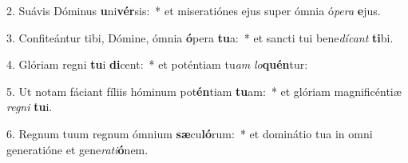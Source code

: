 2. Suávis Dóminus \textbf{u}ni\textbf{vér}sis:~*  et miseratiónes ejus super ómnia ó\textit{pe}\textit{ra} \textbf{e}jus.\

3. Confiteántur tibi, Dómine, ómnia \textbf{ó}pera \textbf{tu}a:~*  et sancti tui bene\textit{dí}\textit{cant} \textbf{ti}bi.\

4. Glóriam regni \textbf{tu}i \textbf{di}cent:~*  et poténtiam tu\textit{am} \textit{lo}\textbf{quén}tur:\

5. Ut notam fáciant fíliis hóminum pot\textbf{én}tiam \textbf{tu}am:~*  et glóriam magnificéntiæ \textit{re}\textit{gni} \textbf{tu}i.\

6. Regnum tuum regnum ómnium \textbf{sæ}cu\textbf{ló}rum:~*  et dominátio tua in omni generatióne et gene\textit{ra}\textit{ti}\textbf{ó}nem.\


